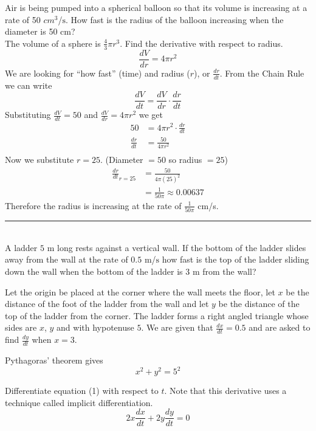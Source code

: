 \examq Air is being pumped into a spherical balloon so that its volume is increasing at a rate of 50 $cm^{3}$/$\mbox{s}$. How fast is the radius of the balloon increasing when the diameter is 50 $\mbox{cm}$? \\
\solution The volume of a sphere is $\frac{4}{3}\pi r^3$. Find the derivative with respect to radius.
\[\frac{d V}{d r} =4 \pi r^2\]
We are looking for ``how fast'' (time) and radius ($r$), or $\frac{dr}{dt}$. From the Chain Rule we can write
\[\frac{d V}{d t} =\frac{d V}{d r} \cdot \frac{d r}{d t}\]
Substituting $\frac{d V}{d t} =50$ and $\frac{d V}{d r} =4 \pi  r^{2}$ we get
\begin{align*}50 &  = 4 \pi  r^{2} \cdot \frac{d r}{d t} \\
\frac{d r}{d t} &  = \frac{50}{4 \pi  r^{2}} \\
\end{align*}
Now we substitute $r =25$. (Diameter $ =50$ so radius $ =25$)
\begin{align*}\frac{d r}{d t}_{r =25} &  = \frac{50}{4\pi(25)^2} \\
&  = \frac{1}{50 \pi }\approx 0.00637\end{align*}
Therefore the radius is increasing at the rate of $\displaystyle\frac{1}{50 \pi }$ cm/s.\\ 
\rule{6.8cm}{0.5pt}\\
\example A ladder $5$ $\mbox{m}$ long rests against a vertical wall. If the bottom of the ladder slides away from the wall at the rate of $0.5$ $\mbox{m}$/$\mbox{s}$ how fast is the top of the ladder sliding down the wall when the bottom of the ladder is $3$ $\mbox{m}$ from the wall? 

\solution Let the origin be placed at the corner where the wall meets the floor, let $x$ be the distance of the foot of the ladder from the wall and let $y$ be the distance of the top of the ladder from the corner. The ladder forms a right angled triangle whose sides are $x$, $y$ and with hypotenuse $5$. We are given that $\frac{d x}{d t} =0.5$ and are asked to find $\frac{d y}{d t}$ when $x =3$. 

Pythagoras' theorem gives
\begin{equation}x^{2} +y^{2} =5^{2}\tag{1}
\end{equation}

Differentiate equation (1) with respect to $t$. Note that this derivative uses a technique called implicit differentiation. 
\begin{equation*}2 x \frac{d x}{d t} +2 y \frac{d y}{d t} =0
\end{equation*}

